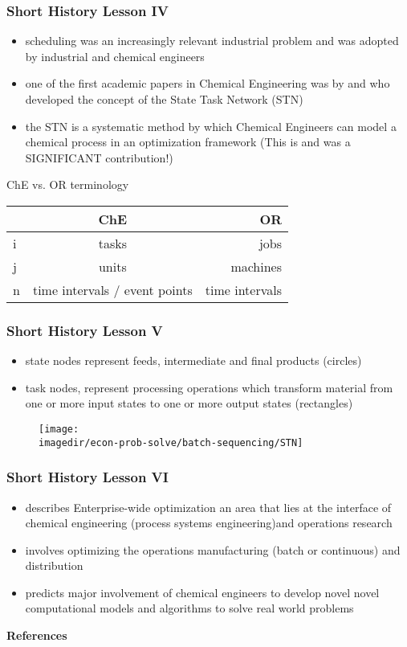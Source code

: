 \begin{frame}\frametitle{Short History Lesson IV}
	\begin{itemize}
		\item	scheduling was an increasingly relevant industrial problem and was adopted by industrial and chemical engineers 
		\item	one of the first academic papers in Chemical Engineering was by \cite{kondili} and \cite{shah} who developed the concept of the State Task Network (STN) 
		\item	the STN is a systematic method by which Chemical Engineers can model a chemical process in an optimization framework (This is and was a SIGNIFICANT contribution!) 
	\end{itemize}
	\begin{center}
		ChE vs. OR terminology
		\begin{tabular}
			{ l | c | r } \hline & ChE & OR \\
			\hline i & tasks & jobs \\
			j & units & machines \\
			n & time intervals / event points & time intervals \\
			\hline 
		\end{tabular}
	\end{center}
\end{frame}

\begin{frame}\frametitle{Short History Lesson V}
	\begin{itemize}
		\item	state nodes represent feeds, intermediate and final products (circles) 
		\item	task nodes, represent processing operations which transform material from one or more input states to one or more output states (rectangles) 
	\end{itemize}
	\begin{figure}
		[!htb] 
		\begin{center}
			\texttt{[image: \\imagedir/econ-prob-solve/batch-sequencing/STN]} \label{fig:STN} 
		\end{center}
	\end{figure}
\end{frame}

\begin{frame}\frametitle{Short History Lesson VI}
	\begin{itemize}
		\item	\cite{EWO} describes Enterprise-wide optimization an area that lies at the interface of chemical engineering (process systems engineering)and operations research 
		\item	involves optimizing the operations manufacturing (batch or continuous) and distribution 
		\item	predicts major involvement of chemical engineers to develop novel novel computational models and algorithms to solve real world problems \cite{EWO} 
	\end{itemize}
\end{frame}

{\bf References}
 
 
